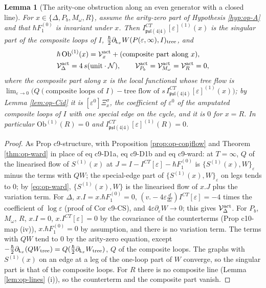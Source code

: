 \documentclass[11pt]{article}
\numberwithin{equation}{section}
\theoremstyle{plain}
\newtheorem{lemma}[theorem]{Lemma}
\theoremstyle{definition}
\newcommand{\psl}{\mathfrak{psl}(4|4)}
\newcommand{\Fc}{\mathcal N}
\newcommand{\Var}{\mathcal V}
\begin{document}
\begin{lemma}[The arity-one obstruction along an even generator with a closed line]
\label{lem:op-obeven}
For $x\in\{\Delta,P_b,M_\omega,R\}$, assume the arity-zero part of Hypothesis \ref{hyp:op-A} and that $\hbar F_1^{(0)}$ is invariant under $x$. Then $I^{CT}_{\psl}[\varepsilon]^{(1)}(x)$ is the singular part of the composite loops of $I$, $\tfrac\hbar2\partial_{\mathsf L_x}W(P(\varepsilon,\infty),I)_{\rm tree}$, and
\[
\begin{aligned}
&\hbar\,\mathrm{Ob}^{(1)}(x)=\Var^{\rm act}_x+(\text{composite part along }x),\\
&\Var^{\rm act}_\Delta=4\,s(\text{unit}\cdot\Fc),\qquad \Var^{\rm act}_{P_b}=\Var^{\rm act}_{M_\omega}=\Var^{\rm act}_R=0,
\end{aligned}
\]
where the composite part along $x$ is the local functional whose tree flow is $\lim_{\varepsilon\to0}\big(Q(\text{composite loops of }I)-\text{tree flow of }s\,I^{CT}_{\psl}[\varepsilon]^{(1)}(x)\big)$; by Lemma \ref{lem:op-Cid} it is $[\varepsilon^0]\Xi^\sigma_x$, the coefficient of $\varepsilon^0$ of the amputated composite loops of $I$ with one special edge on the cycle, and it is $0$ for $x=R$. In particular $\mathrm{Ob}^{(1)}(R)=0$ and $I^{CT}_{\psl}[\varepsilon]^{(1)}(R)=0$.
\end{lemma}

\begin{proof}
As Prop c9-structure, with Proposition \ref{prop:op-conjflow} and Theorem \ref{thm:op-ward} in place of eq c9-D1a, eq c9-D1b and eq c9-ward: at $T=\infty$, $Q$ of the linearised flow of $S^{(1)}(x)$ at $J=I-I^{CT}[\varepsilon]-\hbar F_1^{(0)}$ is $\{S^{(1)}(x),W\}_\varepsilon$ minus the terms with $QW$; the special-edge part of $\{S^{(1)}(x),W\}_\varepsilon$ on legs tends to $0$; by \eqref{eq:op-ward}, $\{S^{(1)}(x),W\}$ is the linearised flow of $x.J$ plus the variation term. For $\Delta$, $x.I=x.\hbar F_1^{(0)}=0$, $(v.-4\varepsilon\tfrac d{d\varepsilon})I^{CT}[\varepsilon]=-4$ times the coefficient of $\log\varepsilon$ (proof of Cor c9-CS), and $4\varepsilon\partial_\varepsilon W\to0$; this gives $\Var^{\rm act}_\Delta$. For $P_b$, $M_\omega$, $R$, $x.I=0$, $x.I^{CT}[\varepsilon]=0$ by the covariance of the counterterms (Prop c10-map (iv)), $x.\hbar F_1^{(0)}=0$ by assumption, and there is no variation term. The terms with $QW$ tend to $0$ by the arity-zero equation, except $-\tfrac\hbar2\partial_{\mathsf L_x}(QW_{\rm tree})=Q(\tfrac\hbar2\partial_{\mathsf L_x}W_{\rm tree})$, $Q$ of the composite loops. The graphs with $S^{(1)}(x)$ on an edge at a leg of the one-loop part of $W$ converge, so the singular part is that of the composite loops. For $R$ there is no composite line (Lemma \ref{lem:op-lines} (i)), so the counterterm and the composite part vanish.
\end{proof}
\end{document}
